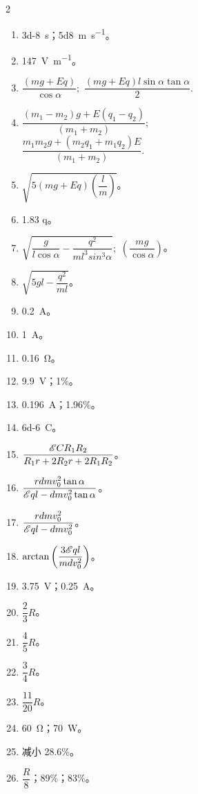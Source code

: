 \begin{fullwidth}
\begin{multicols}{2}
\begin{enumerate}[label=\arabic*.]
\item \SI{3d-8}{\second}；\SI[per-mode=symbol]{5d8}{\metre\per\second}。
\item \SI[per-mode=symbol]{147}{\volt\per\metre}。
\item  $\dfrac{(mg+ Eq)}{\cos \alpha}; \,\, \dfrac{(mg+Eq) l \sin \alpha \tan \alpha}{2}.$
\item $\dfrac{(m_{1} - m_{2})g+E(q_{1}-q_{2})}{(m_{1} + m_{2})};$\\
$\dfrac{m_{1} m_{2}g + (m_{2}q_{1} +  m_{1}q_{2} )E}{(m_{1} + m_{2})}.$
\item $\sqrt{5\left( mg +Eq \right) \left( \dfrac{l}{m} \right)}$。
\item 1.83 q。
\item $\sqrt{\dfrac{g}{l \cos \alpha} - \dfrac{q^{2}}{ml^{3} sin^{3} \alpha}};\,\, \left( \dfrac{mg}{\cos \alpha} \right)$。
\item $\sqrt{5gl - \dfrac{q^{2}}{ml}}$。
\item \SI{0.2}{\ampere}。
\item \SI{1}{\ampere}。
\item \SI{0.16}{\ohm}。
\item \SI{9.9}{\volt}；1\%。
\item \SI{0.196}{\ampere}；1.96\%。
\item \SI{6d-6}{\coulomb}。
\item $\dfrac{\mathcal{E} C R_{1}R_{2}}{R_{1}r+2R_{2}r+2R_{1}R_{2}}$。
\item $\dfrac{rdmv_{0}^{2} \tan \alpha}{\mathcal{E} ql - dmv_{0}^{2} \tan \alpha}$。
\item $\dfrac{rdmv_{0}^{2}}{\mathcal{E} ql - dmv_{0}^{2}}$。
\item $\arctan \left( \dfrac{3 \mathcal{E} ql }{mdv_{0}^{2}} \right)$。
\item \SI{3.75}{\volt}；\SI{0.25}{\ampere}。
\item $\dfrac{2}{3} R$。
\item $\dfrac{4}{5} R$。
\item $\dfrac{3}{4} R$。
\item $\dfrac{11}{20} R$。
\item \SI{60}{\ohm}；\SI{70}{\watt}。
\item 减小 28.6\%。
\item $\dfrac{R}{8}$；89\%；83\%。

\end{enumerate}
\end{multicols}
\end{fullwidth}
